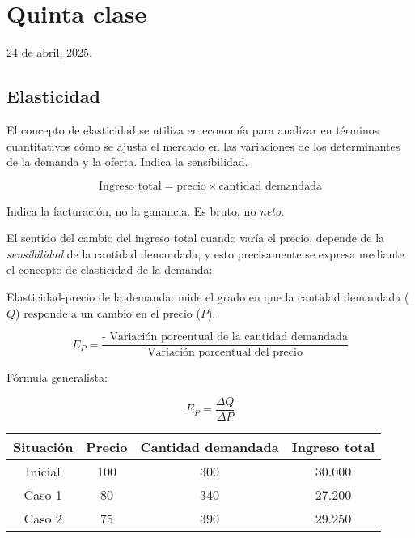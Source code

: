 \section{Quinta clase}

24 de abril, 2025.

\subsection{Elasticidad}

El concepto de elasticidad se utiliza en economía para analizar en términos cuantitativos
cómo se ajusta el mercado en las variaciones de los determinantes de la demanda y la oferta.
Indica la sensibilidad.

\begin{equation*}
    \text{Ingreso total} = \text{precio} \times \text{cantidad demandada}
\end{equation*}

Indica la facturación, no la ganancia.
Es bruto, no \textit{neto}.

El sentido del cambio del ingreso total cuando varía el precio,
depende de la \textit{sensibilidad} de la cantidad demandada,
y esto precisamente se expresa mediante el concepto de elasticidad de la demanda:

Elasticidad-precio de la demanda:
mide el grado en que la cantidad demandada (\(Q\)) responde a un cambio en el precio (\(P\)).

\begin{equation*}
    E_P = \frac{\text{- Variación porcentual de la cantidad demandada}}{\text{Variación porcentual del precio}}
\end{equation*}

Fórmula generalista:

\begin{equation*}
    E_P = \frac{\Delta Q}{\Delta P}
\end{equation*}

\begin{table}[H]
    \centering
    \begin{tabular}{cccc} %
        \hline
        Situación & Precio & Cantidad demandada & Ingreso total \\
        \hline
        Inicial   & 100    & 300                & 30.000        \\
        Caso 1    & 80     & 340                & 27.200        \\
        Caso 2    & 75     & 390                & 29.250        \\
        \hline
    \end{tabular}
\end{table}

